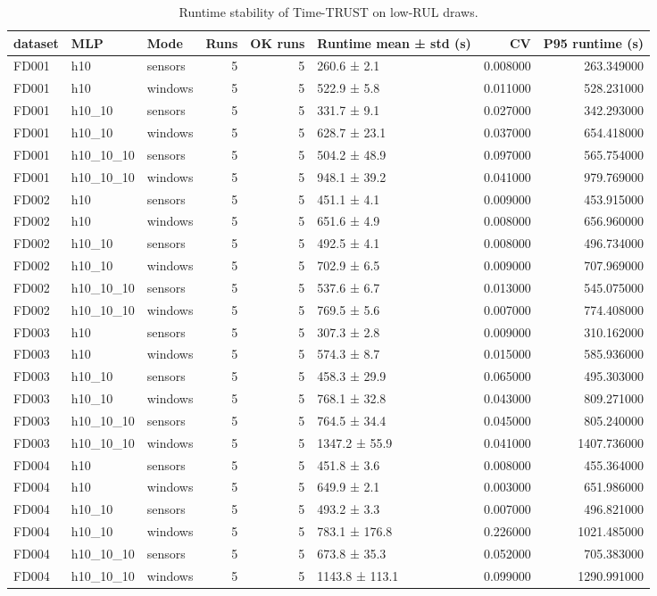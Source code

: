\begin{table}
\caption{Runtime stability of Time-TRUST on low-RUL draws.}
\begin{tabular}{lllrrlrr}
\toprule
dataset & MLP & Mode & Runs & OK runs & Runtime mean ± std (s) & CV & P95 runtime (s) \\
\midrule
FD001 & h10 & sensors & 5 & 5 & 260.6 ± 2.1 & 0.008000 & 263.349000 \\
FD001 & h10 & windows & 5 & 5 & 522.9 ± 5.8 & 0.011000 & 528.231000 \\
FD001 & h10_10 & sensors & 5 & 5 & 331.7 ± 9.1 & 0.027000 & 342.293000 \\
FD001 & h10_10 & windows & 5 & 5 & 628.7 ± 23.1 & 0.037000 & 654.418000 \\
FD001 & h10_10_10 & sensors & 5 & 5 & 504.2 ± 48.9 & 0.097000 & 565.754000 \\
FD001 & h10_10_10 & windows & 5 & 5 & 948.1 ± 39.2 & 0.041000 & 979.769000 \\
FD002 & h10 & sensors & 5 & 5 & 451.1 ± 4.1 & 0.009000 & 453.915000 \\
FD002 & h10 & windows & 5 & 5 & 651.6 ± 4.9 & 0.008000 & 656.960000 \\
FD002 & h10_10 & sensors & 5 & 5 & 492.5 ± 4.1 & 0.008000 & 496.734000 \\
FD002 & h10_10 & windows & 5 & 5 & 702.9 ± 6.5 & 0.009000 & 707.969000 \\
FD002 & h10_10_10 & sensors & 5 & 5 & 537.6 ± 6.7 & 0.013000 & 545.075000 \\
FD002 & h10_10_10 & windows & 5 & 5 & 769.5 ± 5.6 & 0.007000 & 774.408000 \\
FD003 & h10 & sensors & 5 & 5 & 307.3 ± 2.8 & 0.009000 & 310.162000 \\
FD003 & h10 & windows & 5 & 5 & 574.3 ± 8.7 & 0.015000 & 585.936000 \\
FD003 & h10_10 & sensors & 5 & 5 & 458.3 ± 29.9 & 0.065000 & 495.303000 \\
FD003 & h10_10 & windows & 5 & 5 & 768.1 ± 32.8 & 0.043000 & 809.271000 \\
FD003 & h10_10_10 & sensors & 5 & 5 & 764.5 ± 34.4 & 0.045000 & 805.240000 \\
FD003 & h10_10_10 & windows & 5 & 5 & 1347.2 ± 55.9 & 0.041000 & 1407.736000 \\
FD004 & h10 & sensors & 5 & 5 & 451.8 ± 3.6 & 0.008000 & 455.364000 \\
FD004 & h10 & windows & 5 & 5 & 649.9 ± 2.1 & 0.003000 & 651.986000 \\
FD004 & h10_10 & sensors & 5 & 5 & 493.2 ± 3.3 & 0.007000 & 496.821000 \\
FD004 & h10_10 & windows & 5 & 5 & 783.1 ± 176.8 & 0.226000 & 1021.485000 \\
FD004 & h10_10_10 & sensors & 5 & 5 & 673.8 ± 35.3 & 0.052000 & 705.383000 \\
FD004 & h10_10_10 & windows & 5 & 5 & 1143.8 ± 113.1 & 0.099000 & 1290.991000 \\
\bottomrule
\end{tabular}
\end{table}
